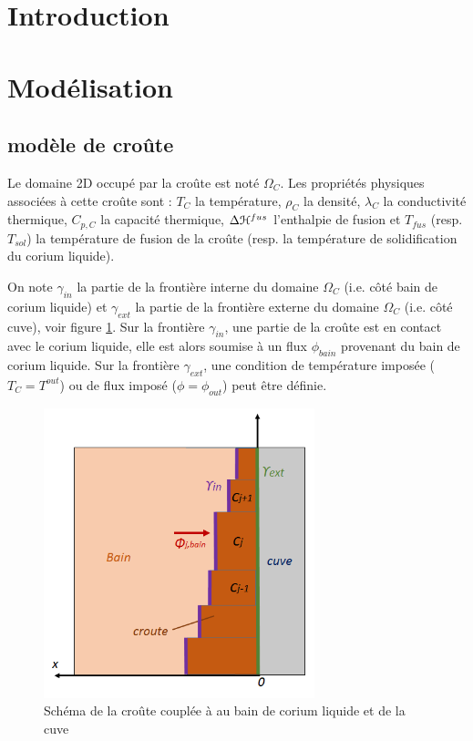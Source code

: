 \documentclass[12pt,a4paper,lmag,nt,article,french]{docDTN}
\begin{document}
\section{Introduction}
\section{Modélisation}
\subsection{modèle de croûte}
Le domaine 2D occupé par la croûte est noté $\Omega_C$. Les propriétés physiques associées à cette croûte sont : $T_C$ la température, $\rho_C$ la densité, $\lambda_C$ la conductivité thermique, $C_{p,C}$ la capacité thermique, $\Delta {\cal H}^{fus}$ l'enthalpie de fusion et $T_{fus}$ (resp. $T_{sol}$) la température de fusion de la croûte (resp. la température de solidification du corium liquide).


On note $\gamma_{in}$ la partie de la frontière interne du domaine $\Omega_C$ (i.e. côté bain de corium liquide) et $\gamma_{ext}$ la partie de la frontière externe du domaine $\Omega_C$ (i.e. côté cuve), voir figure \ref{fig:crust_figure}. Sur la frontière $\gamma_{in}$, une partie de la croûte est en contact avec le corium liquide, elle est alors soumise à un flux $\phi_{bain}$ provenant du bain de corium liquide. Sur la frontière $\gamma_{ext}$, une condition de température imposée ($T_C=T^{out}$) ou de flux imposé ($\phi=\phi_{out}$) peut être définie.

\begin{figure}[H]
\centering
\includegraphics[width=0.7\textwidth]{Figures/crust_figure.png}
\caption{Schéma de la croûte couplée à au bain de corium liquide et de la cuve} \label{fig:crust_figure}
\end{figure}
\end{document}
